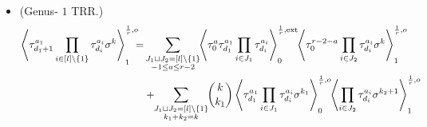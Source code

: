 \documentclass[11pt]{amsart}
\theoremstyle{definition}
\theoremstyle{remark}
\newcommand{\<}{\left<}
\renewcommand{\>}{\right>}
\numberwithin{equation}{section}
\begin{document}
\begin{itemize}
Then
\begin{align*}
\<\tau_{d_1+1}^{a_1}\prod_{i=2}^l\tau^{a_i}_{d_i}\sigma^k\>^{\frac{1}{r},o}_0=&
\sum_{a=-1}^{r-2}\sum_{S \sqcup R = \{3,\ldots,l\}}\left\langle \tau_0^{a}\tau_{d_1}^{a_1}\prod_{i \in S}\tau_{d_i}^{a_i}\right\rangle^{\frac{1}{r},{ext}}_0
\left\langle \tau_0^{r-2-a}\tau^{a_2}_{d_2}\prod_{i\in R}\tau^{a_i}_{d_i}\sigma^k\right\rangle^{\frac{1}{r},o}_0+\\
&+\sum_{\substack{S \sqcup R = \{3,\ldots,l\} \\ k_1 + k_2 = k}} \binom{k}{k_1} \left\langle \tau^{a_1}_{d_1} \prod_{i \in S} \tau^{a_i}_{d_i}\sigma^{k_1}\right\rangle^{\frac{1}{r},o}_0 \left\langle \tau^{a_2}_{d_2}\prod_{i \in R} \tau^{a_i}_{d_i} \sigma^{k_2+1}\right\rangle^{\frac{1}{r}, o}_0.
\end{align*}
\item[(c)](Genus- $1$ TRR.)
\begin{equation}
\begin{split}
\left\langle \tau_{d_{1}+1}^{a_1}\prod_{i\in [l]\setminus \{1\}}\tau^{a_i}_{d_i}\sigma^k\right\rangle^{\frac{1}{r},o}_1\hspace{-0.2cm}
=&\sum_{\substack{J_1 \sqcup J_2 = [l]\setminus\{1\}\\ -1\le a \le r-2}}\hspace{-0.1cm}\left\langle \tau_0^{a}\tau_{d_{1}}^{a_{1}}\prod_{i \in J_1}\tau_{d_i}^{a_i}\right\rangle^{\frac{1}{r},\text{ext}}_0
\hspace{-0.1cm}\left\langle \tau_0^{r-2-a}\prod_{i\in J_2}\tau^{a_i}_{d_i}\sigma^k\right\rangle^{\frac{1}{r},o}_1\\
&+\hspace{-0.1cm}\sum_{\substack{J_1 \sqcup J_2 =  [l]\setminus\{1\} \\ k_1+k_2=k}} \hspace{-0.1cm} \binom{k}{k_1}\left\langle \tau^{a_{1}}_{d_{1}}\prod_{i \in J_1} \tau^{a_i}_{d_i}\sigma^{k_1}\right\rangle^{\frac{1}{r},o}_0 \hspace{-0.1cm}\left\langle \prod_{i \in J_2} \tau^{a_i}_{d_i} \sigma^{k_2+1}\right\rangle^{\frac{1}{r}, o}_1\\

\end{split}
\end{equation}
\end{itemize}
\end{document}
